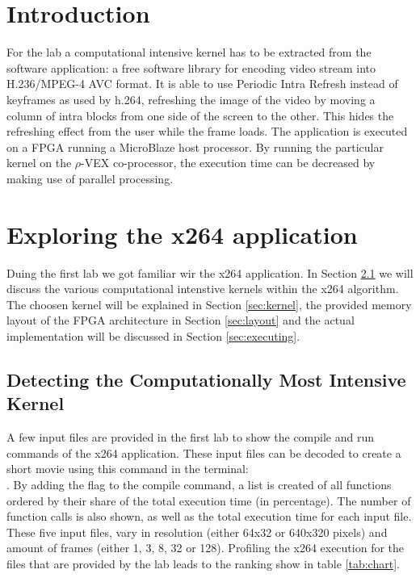 \section{Introduction}
For the lab a computational intensive kernel has to be extracted from the  software application: a free software library for encoding video stream into H.236/MPEG-4 AVC format. It is able to use Periodic Intra Refresh instead of keyframes as used by h.264, refreshing the image of the video by moving a column of intra blocks from one side of the screen to the other. This hides the refreshing effect from the user while the frame loads. The  application is executed on a FPGA running a MicroBlaze host processor. By running the particular kernel on the $\rho$-VEX co-processor, the execution time can be decreased by making use of parallel processing. 

\section{Exploring the x264 application}
Duing the first lab we got familiar wir the x264 application. In Section \ref{sec:intensive} we will discuss the various computational intenstive kernels within the x264 algorithm. The choosen kernel will be explained in Section \ref{sec:kernel}, the provided memory layout of the FPGA architecture in Section \ref{sec:layout} and the actual implementation will be discussed in Section \ref{sec:executing}.

\subsection{Detecting the Computationally Most Intensive Kernel}
\label{sec:intensive}
A few input files are provided in the first lab to show the compile and run commands of the x264 application. These  input files can be decoded to create a short  movie using this command in the terminal: \\
. By adding the  flag to the compile command, a list is created of all functions ordered by their share of the total execution time (in percentage). The number of function calls is also shown, as well as the total execution time for each input file. These five input  files, vary in resolution (either 64x32 or 640x320 pixels) and amount of frames (either 1, 3, 8, 32 or 128). Profiling the x264 execution for the  files that are provided by the lab leads to the ranking show in table \ref{tab:chart}.

